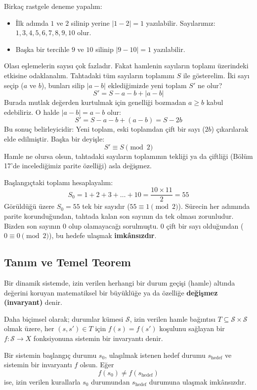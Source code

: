 Birkaç rastgele deneme yapalım:
\begin{itemize}
    \item İlk adımda $1$ ve $2$ silinip yerine $|1 - 2| = 1$ yazılabilir. Sayılarımız: $1, 3, 4, 5, 6, 7, 8, 9, 10$ olur.
    \item Başka bir tercihle $9$ ve $10$ silinip $|9 - 10| = 1$ yazılabilir.
\end{itemize}
Olası eşlemelerin sayısı çok fazladır. Fakat hamlenin sayıların toplamı üzerindeki etkisine odaklanalım. Tahtadaki tüm sayıların toplamını $S$ ile gösterelim. İki sayı seçip ($a$ ve $b$), bunları silip $|a - b|$ eklediğimizde yeni toplam $S'$ ne olur?
\[
S' = S - a - b + |a - b|
\]
Burada mutlak değerden kurtulmak için genelliği bozmadan $a \ge b$ kabul edebiliriz. O halde $|a - b| = a - b$ olur:
\[
S' = S - a - b + (a - b) = S - 2b
\]
Bu sonuç belirleyicidir: Yeni toplam, eski toplamdan çift bir sayı ($2b$) çıkarılarak elde edilmiştir. Başka bir deyişle:
\[
S' \equiv S \pmod 2
\]
Hamle ne olursa olsun, tahtadaki sayıların toplamının tekliği ya da çiftliği (Bölüm 17'de incelediğimiz parite özelliği) asla değişmez.

Başlangıçtaki toplamı hesaplayalım:
\[
S_0 = 1 + 2 + 3 + \dots + 10 = \frac{10 \times 11}{2} = 55
\]
Görüldüğü üzere $S_0 = 55$ tek bir sayıdır ($55 \equiv 1 \pmod 2$). Sürecin her adımında parite korunduğundan, tahtada kalan son sayının da tek olması zorunludur. Bizden son sayının $0$ olup olamayacağı sorulmuştu. $0$ çift bir sayı olduğundan ($0 \equiv 0 \pmod 2$), bu hedefe ulaşmak \textbf{imkânsızdır}.

\subsection{Tanım ve Temel Teorem}

\begin{definition}
Bir dinamik sistemde, izin verilen herhangi bir durum geçişi (hamle) altında değerini koruyan matematiksel bir büyüklüğe ya da özelliğe \textbf{değişmez (invaryant)} denir. 

Daha biçimsel olarak; durumlar kümesi $\mathcal{S}$, izin verilen hamle bağıntısı $T \subseteq \mathcal{S} \times \mathcal{S}$ olmak üzere, her $(s, s') \in T$ için $f(s) = f(s')$ koşulunu sağlayan bir $f: \mathcal{S} \to X$ fonksiyonuna sistemin bir invaryantı denir.
\end{definition}

\begin{theorem}
Bir sistemin başlangıç durumu $s_0$, ulaşılmak istenen hedef durumu $s_{\text{hedef}}$ ve sistemin bir invaryantı $f$ olsun. Eğer
\[
f(s_0) \neq f(s_{\text{hedef}})
\]
ise, izin verilen kurallarla $s_0$ durumundan $s_{\text{hedef}}$ durumuna ulaşmak imkânsızdır.
\end{theorem}

